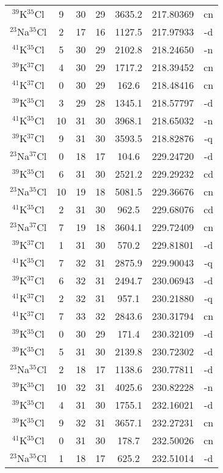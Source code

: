 \begin{table*}[htp]
\begin{tabular}{ccccccc}
$^{39}$K$^{35}$Cl & 9 & 30 & 29 & 3635.2 & 217.80369 & cn \\
$^{23}$Na$^{35}$Cl & 2 & 17 & 16 & 1127.5 & 217.97933 & -d \\
$^{41}$K$^{35}$Cl & 5 & 30 & 29 & 2102.8 & 218.24650 & -n \\
$^{39}$K$^{37}$Cl & 4 & 30 & 29 & 1717.2 & 218.39452 & cn \\
$^{41}$K$^{37}$Cl & 0 & 30 & 29 & 162.6 & 218.48416 & cn \\
$^{39}$K$^{35}$Cl & 3 & 29 & 28 & 1345.1 & 218.57797 & -d \\
$^{41}$K$^{35}$Cl & 10 & 31 & 30 & 3968.1 & 218.65032 & -n \\
$^{39}$K$^{37}$Cl & 9 & 31 & 30 & 3593.5 & 218.82876 & -q \\
$^{23}$Na$^{37}$Cl & 0 & 18 & 17 & 104.6 & 229.24720 & -d \\
$^{39}$K$^{35}$Cl & 6 & 31 & 30 & 2521.2 & 229.29232 & cd \\
$^{23}$Na$^{35}$Cl & 10 & 19 & 18 & 5081.5 & 229.36676 & cn \\
$^{41}$K$^{35}$Cl & 2 & 31 & 30 & 962.5 & 229.68076 & cd \\
$^{23}$Na$^{37}$Cl & 7 & 19 & 18 & 3604.1 & 229.72409 & cn \\
$^{39}$K$^{37}$Cl & 1 & 31 & 30 & 570.2 & 229.81801 & -d \\
$^{41}$K$^{35}$Cl & 7 & 32 & 31 & 2875.9 & 229.90043 & -q \\
$^{39}$K$^{37}$Cl & 6 & 32 & 31 & 2494.7 & 230.06943 & -d \\
$^{41}$K$^{37}$Cl & 2 & 32 & 31 & 957.1 & 230.21880 & -q \\
$^{41}$K$^{37}$Cl & 7 & 33 & 32 & 2843.6 & 230.31794 & cn \\
$^{39}$K$^{35}$Cl & 0 & 30 & 29 & 171.4 & 230.32109 & -d \\
$^{39}$K$^{35}$Cl & 5 & 31 & 30 & 2139.8 & 230.72302 & -d \\
$^{23}$Na$^{35}$Cl & 2 & 18 & 17 & 1138.6 & 230.77811 & -d \\
$^{39}$K$^{35}$Cl & 10 & 32 & 31 & 4025.6 & 230.82228 & -n \\
$^{39}$K$^{35}$Cl & 4 & 31 & 30 & 1755.1 & 232.16021 & -d \\
$^{39}$K$^{35}$Cl & 9 & 32 & 31 & 3657.1 & 232.27231 & cn \\
$^{41}$K$^{35}$Cl & 0 & 31 & 30 & 178.7 & 232.50026 & cn \\
$^{23}$Na$^{35}$Cl & 1 & 18 & 17 & 625.2 & 232.51014 & -d \\

\end{tabular}
\end{table*}
